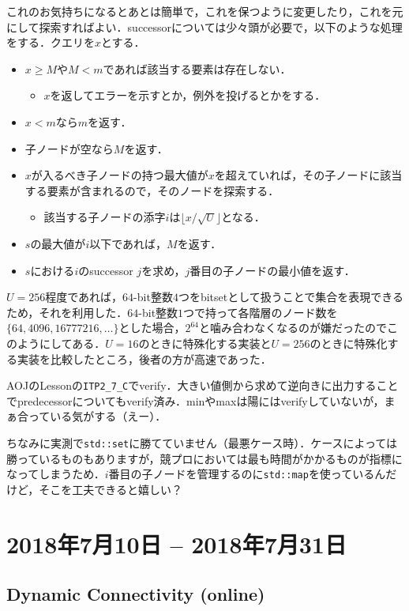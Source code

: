 \documentclass[a4paper]{jsarticle}
\begin{document}
これのお気持ちになるとあとは簡単で，これを保つように変更したり，これを元にして探索すればよい．successorについては少々頭が必要で，以下のような処理をする．クエリを$x$とする．
\begin{itemize}
\item $x\ge M$や$M<m$であれば該当する要素は存在しない．
  \begin{itemize}
  \item $x$を返してエラーを示すとか，例外を投げるとかをする．
  \end{itemize}
\item $x<m$なら$m$を返す．
\item 子ノードが空なら$M$を返す．
\item $x$が入るべき子ノードの持つ最大値が$x$を超えていれば，その子ノードに該当する要素が含まれるので，そのノードを探索する．
  \begin{itemize}
  \item 該当する子ノードの添字$i$は$\lfloor x/\sqrt{U}\rfloor$となる．
  \end{itemize}
\item $s$の最大値が$i$以下であれば，$M$を返す．
\item $s$における$i$のsuccessor $j$を求め，$j$番目の子ノードの最小値を返す．
\end{itemize}

$U=256$程度であれば，$64$-bit整数$4$つをbitsetとして扱うことで集合を表現できるため，それを利用した．$64$-bit整数$1$つで持って各階層のノード数を$\{64, 4096, 16777216, \ldots\}$とした場合，$2^{64}$と噛み合わなくなるのが嫌だったのでこのようにしてある．$U=16$のときに特殊化する実装と$U=256$のときに特殊化する実装を比較したところ，後者の方が高速であった．

AOJのLessonの\texttt{ITP2\_7\_C}でverify．大きい値側から求めて逆向きに出力することでpredecessorについてもverify済み．minやmaxは陽にはverifyしていないが，まぁ合っている気がする（えー）．

ちなみに実測で\texttt{std::set}に勝てていません（最悪ケース時）．ケースによっては勝っているものもありますが，競プロにおいては最も時間がかかるものが指標になってしまうため．$i$番目の子ノードを管理するのに\texttt{std::map}を使っているんだけど，そこを工夫できると嬉しい？

\section{2018年7月10日 -- 2018年7月31日}
\subsection{Dynamic Connectivity (online)}
\end{document}
